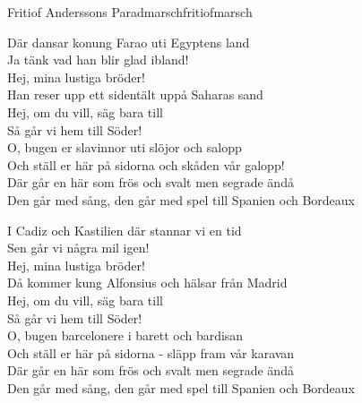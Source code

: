 \begin{song}{Fritiof Anderssons Paradmarsch}{fritiofmarsch}
\begin{vers}
Där dansar konung Farao uti Egyptens land\\
Ja tänk vad han blir glad ibland!\\
Hej, mina lustiga bröder!\\
Han reser upp ett sidentält uppå Saharas sand\\
Hej, om du vill, säg bara till\\
Så går vi hem till Söder!\\
O, bugen er slavinnor uti slöjor och salopp\\
Och ställ er här på sidorna och skåden vår galopp!\\
Där går en här som frös och svalt men segrade ändå\\
Den går med sång, den går med spel till Spanien och Bordeaux\\
\end{vers}
\begin{vers}
I Cadiz och Kastilien där stannar vi en tid\\
Sen går vi några mil igen!\\
Hej, mina lustiga bröder!\\
Då kommer kung Alfonsius och hälsar från Madrid\\
Hej, om du vill, säg bara till\\
Så går vi hem till Söder!\\
O, bugen barcelonere i barett och bardisan\\
Och ställ er här på sidorna - släpp fram vår karavan\\
Där går en här som frös och svalt men segrade ändå\\
Den går med sång, den går med spel till Spanien och Bordeaux\\
\end{vers}

\newp


\end{song}

